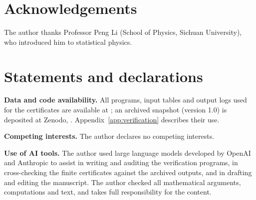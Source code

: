 \section*{Acknowledgements}
The author thanks Professor Peng Li (School of Physics, Sichuan University), who introduced him to statistical physics.

\section*{Statements and declarations}

\noindent\textbf{Data and code availability.} All programs, input tables and output logs used for the certificates are available at \repo; an archived snapshot (version 1.0) is deposited at Zenodo, . Appendix~\ref{app:verification} describes their use.

\smallskip\noindent\textbf{Competing interests.} The author declares no competing interests.

\smallskip\noindent\textbf{Use of AI tools.} The author used large language models developed by OpenAI and Anthropic to assist in writing and auditing the verification programs, in cross-checking the finite certificates against the archived outputs, and in drafting and editing the manuscript. The author checked all mathematical arguments, computations and text, and takes full responsibility for the content.

